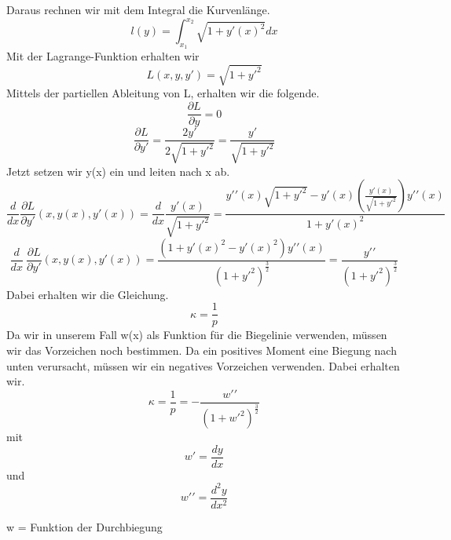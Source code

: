 Daraus rechnen wir mit dem Integral die Kurvenlänge.
\begin{equation}
	l(y)=
	\int_{x_1}^{x_2}\sqrt{1+{y\prime(x)}^2}dx
\end{equation}
Mit der Lagrange-Funktion erhalten wir
\begin{equation}
	L(x,y,y\prime)=
	\sqrt{1+{y\prime}^2}
\end{equation}
Mittels der partiellen Ableitung von L, erhalten wir die folgende.
\begin{equation}
	\frac{\partial L}{\partial y}=
	0
\end{equation}
\begin{equation}
	\frac{\partial L}{\partial y\prime}=
	\frac{2y\prime}{2\sqrt{1+{y\prime}^2}}=
	\frac{y\prime}{\sqrt{1+{y\prime}^2}}
\end{equation}
Jetzt setzen wir y(x) ein und leiten nach x ab.
\begin{equation}
	\frac{d}{dx}\frac{\partial L}{\partial y\prime}(x,y(x),y\prime(x))=
	\frac{d}{dx}\frac{y\prime(x)}{\sqrt{1+{y\prime}^2}}=
	\frac{y\prime\prime(x)\sqrt{1+{y\prime}^2}-y\prime(x)\left(\frac{y\prime(x)}{\sqrt{1+{y\prime}^2}}\right)y\prime\prime(x)}{1+{y\prime(x)}^2}
\end{equation}
\begin{equation}
	\frac{d}{dx}\ \frac{\partial L}{\partial y\prime}(x,y(x),y\prime(x))=
	\frac{(1+{y\prime(x)}^2-{y\prime(x)}^2)y\prime\prime(x)}{\left(1+{y\prime}^2\right)^\frac{3}{2}}=
	\frac{y\prime\prime}{\left(1+{y\prime}^2\right)^\frac{3}{2}}
\end{equation}
Dabei erhalten wir die Gleichung.
\begin{equation}
	\kappa=
	\frac{1}{p}
\end{equation}
Da wir in unserem Fall w(x) als Funktion für die Biegelinie verwenden, müssen wir das Vorzeichen noch bestimmen.
Da ein positives Moment eine Biegung nach unten verursacht, müssen wir ein negatives Vorzeichen verwenden. Dabei erhalten wir.
\begin{equation}
	\kappa=
	\frac{1}{p}=
	-\frac{w\prime\prime}{\left(1+{w\prime}^2\right)^\frac{3}{2}}
\end{equation}
mit
\begin{equation}
	w\prime=
	\frac{dy}{dx} 
\end{equation}
und
\begin{equation}
	w\prime\prime=
	\frac{d^2y}{dx^2}
\end{equation}

w = Funktion der Durchbiegung

